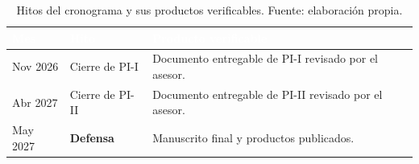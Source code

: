 \documentclass[12pt,letterpaper]{report}
\begin{document}
\begin{table}[H]
    \centering
    \footnotesize
    \setlength{\arrayrulewidth}{0.7pt}
    \setlength{\tabcolsep}{4pt}
    \begin{tabular}{>{\raggedright\arraybackslash}p{2.0cm}
                    >{\raggedright\arraybackslash}p{4.0cm}
                    >{\raggedright\arraybackslash}p{6.4cm}}
        \hline
        \rowcolor{colorprimario!90}
        \textcolor{white}{\textbf{Mes}} & \textcolor{white}{\textbf{Hito}} & \textcolor{white}{\textbf{Producto verificable}} \\
        \hline
        \rowcolor{colorprimario!8}
        Nov 2026 & Cierre de PI-I & Documento entregable de PI-I revisado por el asesor. \\
        Abr 2027 & Cierre de PI-II & Documento entregable de PI-II revisado por el asesor. \\
        \rowcolor{colorprimario!8}
        May 2027 & \textbf{Defensa} & Manuscrito final y productos publicados. \\
        \hline
    \end{tabular}
    \caption[Hitos del cronograma.]{Hitos del cronograma y sus productos verificables. Fuente: elaboración propia.}
    \label{tab:hitos}
\end{table}
\end{document}
